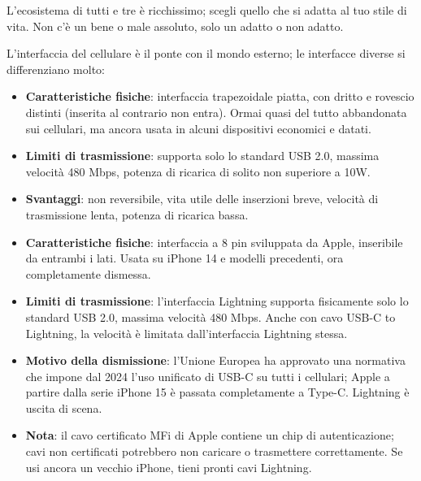 L'ecosistema di tutti e tre è ricchissimo; scegli quello che si adatta al tuo stile di vita. Non c'è un bene o male assoluto, solo un adatto o non adatto.


L'interfaccia del cellulare è il ponte con il mondo esterno; le interfacce diverse si differenziano molto:


\begin{itemize}
  \item \textbf{Caratteristiche fisiche}: interfaccia trapezoidale piatta, con dritto e rovescio distinti (inserita al contrario non entra). Ormai quasi del tutto abbandonata sui cellulari, ma ancora usata in alcuni dispositivi economici e datati.
  \item \textbf{Limiti di trasmissione}: supporta solo lo standard USB 2.0, massima velocità 480 Mbps, potenza di ricarica di solito non superiore a 10W.
  \item \textbf{Svantaggi}: non reversibile, vita utile delle inserzioni breve, velocità di trasmissione lenta, potenza di ricarica bassa.
\end{itemize}


\begin{itemize}
  \item \textbf{Caratteristiche fisiche}: interfaccia a 8 pin sviluppata da Apple, inseribile da entrambi i lati. Usata su iPhone 14 e modelli precedenti, ora completamente dismessa.
  \item \textbf{Limiti di trasmissione}: l'interfaccia Lightning supporta fisicamente solo lo standard USB 2.0, massima velocità 480 Mbps. Anche con cavo USB-C to Lightning, la velocità è limitata dall'interfaccia Lightning stessa.
  \item \textbf{Motivo della dismissione}: l'Unione Europea ha approvato una normativa che impone dal 2024 l'uso unificato di USB-C su tutti i cellulari; Apple a partire dalla serie iPhone 15 è passata completamente a Type-C. Lightning è uscita di scena.
  \item \textbf{Nota}: il cavo certificato MFi di Apple contiene un chip di autenticazione; cavi non certificati potrebbero non caricare o trasmettere correttamente. Se usi ancora un vecchio iPhone, tieni pronti cavi Lightning.
\end{itemize}

